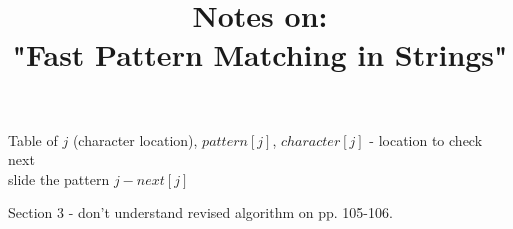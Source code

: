 \documentclass[12pt]{article}
\title{Notes on:\\"Fast Pattern Matching in Strings"}
\author{}
\date{} %
\begin{document}
\maketitle
Table of $j$ (character location), $pattern[j]$, $character[j]$ - location to check next\\
slide the pattern $j - next[j]$

Section 3 - don't understand revised algorithm on pp. 105-106.
\end{document}
